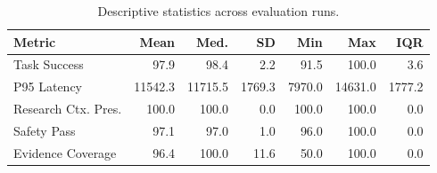 \begin{table}[htbp]
\renewcommand{\arraystretch}{1.2}
\centering
\scriptsize
\setlength{\tabcolsep}{2.5pt}
\caption{Descriptive statistics across evaluation runs.}
\label{tab:descriptive}
\begin{tabular}{p{1.35cm}rrrrrr}
\toprule
\textbf{Metric} & \textbf{Mean} & \textbf{Med.} & \textbf{SD} & \textbf{Min} & \textbf{Max} & \textbf{IQR} \\
\midrule
Task Success & 97.9 & 98.4 & 2.2 & 91.5 & 100.0 & 3.6 \\
P95 Latency & 11542.3 & 11715.5 & 1769.3 & 7970.0 & 14631.0 & 1777.2 \\
Research Ctx. Pres. & 100.0 & 100.0 & 0.0 & 100.0 & 100.0 & 0.0 \\
Safety Pass & 97.1 & 97.0 & 1.0 & 96.0 & 100.0 & 0.0 \\
Evidence Coverage & 96.4 & 100.0 & 11.6 & 50.0 & 100.0 & 0.0 \\
\bottomrule
\end{tabular}
\setlength{\tabcolsep}{6pt}
\end{table}
